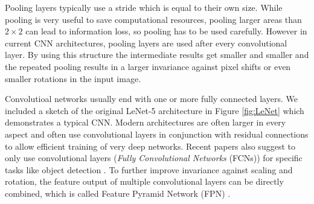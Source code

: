 Pooling layers typically use a stride which is equal to their own size. While pooling is very useful to save computational resources, pooling larger areas than $2 \times 2$ can lead to information loss, so pooling has to be used carefully. However in current CNN architectures, pooling layers are used after every convolutional layer. By using this structure the intermediate results get smaller and smaller and the repeated pooling results in a larger invariance against pixel shifts or even smaller rotations in the input image. 

Convolutioal networks usually end with one or more fully connected layers. We included a sketch of the original LeNet-5 architecture in Figure \ref{fig:LeNet} which demonstrates a typical CNN. Modern architectures are often larger in every aspect and often use convolutional layers in conjunction with residual connections to allow efficient training of very deep networks. Recent papers also suggest to only use convolutional layers (\textit{Fully Convolutional Networks} (FCNs)) for specific tasks like object detection \cite{long2015fully}. To further improve invariance against scaling and rotation, the feature output of multiple convolutional layers can be directly combined, which is called Feature Pyramid Network (FPN) \cite{lin2017feature}. 


